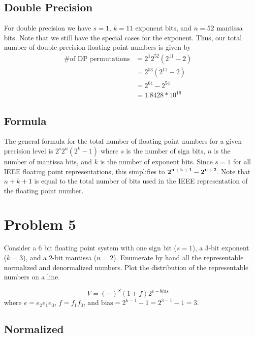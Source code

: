 \documentclass[12pt,letter]{article}
\begin{document}
\subsection{Double Precision}
For double precision we have $s=1$, $k=11$ exponent bits, and $n=52$ mantissa bits. Note that we 
still have the special cases for the exponent. Thus, our total number of double precision floating 
point numbers is given by
\begin{align*}
    \text{\# of DP permutations} &= 2^1 2^{52} (2^{11} - 2) \\
    &= 2^{53} (2^{11} - 2) \\
    &= 2^{64} - 2^{54} \\
    &= 1.8428*10^{19}
\end{align*}

\subsection{Formula}
The general formula for the total number of floating point numbers for a given precision level is
$2^{s} 2^n (2^k - 1)$ where $s$ is the number of sign bits, $n$ is the number of mantissa bits, and 
$k$ is the number of exponent bits. Since $s=1$ for all IEEE floating point representations, this 
simplifies to $\mathbf{2^{n+k+1} - 2^{n+2}}$. Note that $n+k+1$ is equal to the total number of bits 
used in the IEEE representation of the floating point number. 

\section{Problem 5}
\begin{mdframed}
Consider a 6 bit floating point system with one sign bit ($s=1$), a 3-bit exponent ($k=3$), and a 2-bit
mantissa ($n=2$). Enumerate by hand all the representable normalized and denormalized numbers. Plot
the distribution of the representable numbers on a line.
\end{mdframed}

\[
    V = (-)^S (1 + f) 2^{e - bias}
\]
where $e=e_2e_1e_0$, $f=f_1f_0$, and $\text{bias}=2^{k-1} - 1 = 2^{3-1}-1 = 3$.

\subsection{Normalized}
\end{document}

